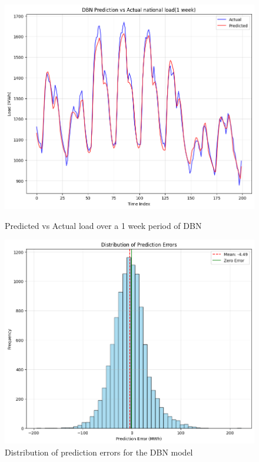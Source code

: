   \begin{figure}[h!]
  	\centering
  	\begin{minipage}[b]{0.45\linewidth}
  		\centering
  		\includegraphics[width=\linewidth]{Chapters/images/results/DBN_predicted_vs_actual}
  		\caption{Predicted vs Actual load over a 1 week period of DBN}
  		\label{fig:dbnpredictedvsactual}
  	\end{minipage}
  	\hfill
  	\begin{minipage}[b]{0.45\linewidth}
  		\centering
  		\includegraphics[width=\linewidth]{Chapters/images/results/dbn_error_distribution}
  		\caption{Distribution of prediction errors for the DBN model}
  		\label{fig:dbnerrordistribution}
  	\end{minipage}
  	
  \end{figure}
  
